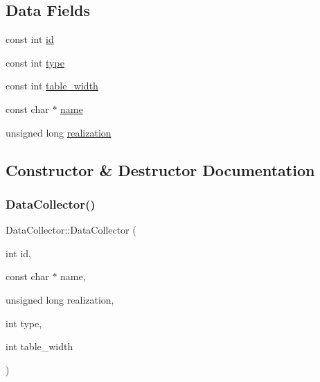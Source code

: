 \subsection*{Data Fields}
\begin{DoxyCompactItemize}
\item 
const int \mbox{\hyperlink{classDataCollector_a5cb840b6fbcf6afe364eef9114984383_a5cb840b6fbcf6afe364eef9114984383}{id}}
\item 
const int \mbox{\hyperlink{classDataCollector_acad1c22d67a8eb3db056ba776a131900_acad1c22d67a8eb3db056ba776a131900}{type}}
\item 
const int \mbox{\hyperlink{classDataCollector_af46c27a47de92d92dcdae6b26a905a44_af46c27a47de92d92dcdae6b26a905a44}{table\+\_\+width}}
\item 
const char $\ast$ \mbox{\hyperlink{classDataCollector_a3a9a5033592f72ada429aa20056162b9_a3a9a5033592f72ada429aa20056162b9}{name}}
\item 
unsigned long \mbox{\hyperlink{classDataCollector_a9ef2887466fe3123aa19ef956a219b96_a9ef2887466fe3123aa19ef956a219b96}{realization}}
\end{DoxyCompactItemize}


\subsection{Constructor \& Destructor Documentation}
\mbox{\label{classDataCollector_a3f89b18f4ac0557d7374d49531a004c0_a3f89b18f4ac0557d7374d49531a004c0}} 
\subsubsection{\texorpdfstring{Data\+Collector()}{DataCollector()}}
{\footnotesize\ttfamily Data\+Collector\+::\+Data\+Collector (\begin{DoxyParamCaption}\item[{int}]{id,  }\item[{const char $\ast$}]{name,  }\item[{unsigned long}]{realization,  }\item[{int}]{type,  }\item[{int}]{table\+\_\+width }\end{DoxyParamCaption})\hspace{0.3cm}{\ttfamily [explicit]}}

